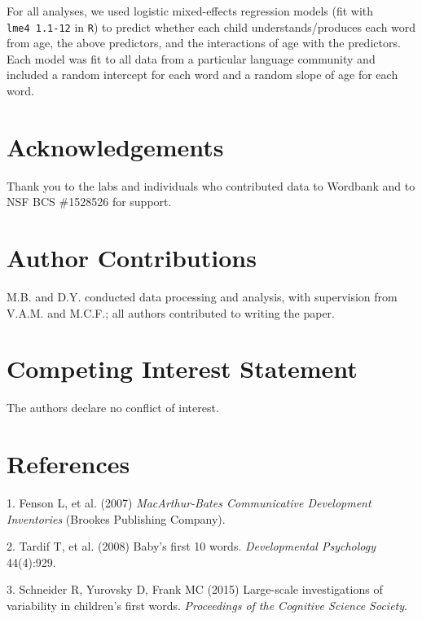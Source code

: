 \documentclass[english,man]{apa6}
\newcounter{author}
\theoremstyle{definition}
\theoremstyle{definition}
\theoremstyle{definition}
\theoremstyle{remark}
\begin{document}
For all analyses, we used logistic mixed-effects regression models (fit
with \texttt{lme4\ 1.1-12} in \texttt{R}) to predict whether each child
understands/produces each word from age, the above predictors, and the
interactions of age with the predictors. Each model was fit to all data
from a particular language community and included a random intercept for
each word and a random slope of age for each word.

\newpage

\section{Acknowledgements}\label{acknowledgements}

Thank you to the labs and individuals who contributed data to Wordbank
and to NSF BCS \#1528526 for support.

\section{Author Contributions}\label{author-contributions}

M.B. and D.Y. conducted data processing and analysis, with supervision
from V.A.M. and M.C.F.; all authors contributed to writing the paper.

\section{Competing Interest
Statement}\label{competing-interest-statement}

The authors declare no conflict of interest.

\newpage

\section{References}\label{references}

\setlength{\parindent}{-0.5in} \setlength{\leftskip}{0.5in}

\hypertarget{refs}{}
\hypertarget{ref-fenson2007}{}
1. Fenson L, et al. (2007) \emph{MacArthur-Bates Communicative
Development Inventories} (Brookes Publishing Company).

\hypertarget{ref-tardif2008}{}
2. Tardif T, et al. (2008) Baby's first 10 words. \emph{Developmental
Psychology} 44(4):929.

\hypertarget{ref-schneider2015}{}
3. Schneider R, Yurovsky D, Frank MC (2015) Large-scale investigations
of variability in children's first words. \emph{Proceedings of the
Cognitive Science Society}.
\end{document}
